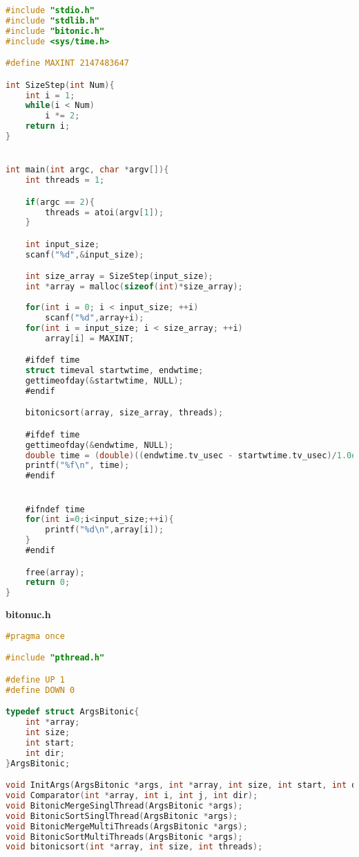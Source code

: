\documentclass[pdf, unicode, 12pt, a4paper,oneside,fleqn]{article}
\begin{document}
\begin{lstlisting}[language=C]
#include "stdio.h"
#include "stdlib.h"
#include "bitonic.h"
#include <sys/time.h>

#define MAXINT 2147483647

int SizeStep(int Num){
    int i = 1;
    while(i < Num)
        i *= 2;
    return i;
}


int main(int argc, char *argv[]){
    int threads = 1;

    if(argc == 2){
        threads = atoi(argv[1]);
    }

    int input_size;
    scanf("%d",&input_size);

    int size_array = SizeStep(input_size); 
    int *array = malloc(sizeof(int)*size_array);
    
    for(int i = 0; i < input_size; ++i)
        scanf("%d",array+i);
    for(int i = input_size; i < size_array; ++i)
        array[i] = MAXINT;

    #ifdef time
    struct timeval startwtime, endwtime;
    gettimeofday(&startwtime, NULL);
    #endif

    bitonicsort(array, size_array, threads);

    #ifdef time
    gettimeofday(&endwtime, NULL);
    double time = (double)((endwtime.tv_usec - startwtime.tv_usec)/1.0e6 + endwtime.tv_sec - startwtime.tv_sec);
    printf("%f\n", time);
    #endif


    #ifndef time
    for(int i=0;i<input_size;++i){
        printf("%d\n",array[i]);
    }
    #endif

    free(array);
    return 0;
}
\end{lstlisting}

{\large\textbf{bitonuc.h}}

\begin{lstlisting}[language=C]
#pragma once

#include "pthread.h"

#define UP 1
#define DOWN 0

typedef struct ArgsBitonic{
    int *array;
    int size;
    int start;
    int dir;
}ArgsBitonic;

void InitArgs(ArgsBitonic *args, int *array, int size, int start, int dir);
void Comparator(int *array, int i, int j, int dir);
void BitonicMergeSinglThread(ArgsBitonic *args);
void BitonicSortSinglThread(ArgsBitonic *args);
void BitonicMergeMultiThreads(ArgsBitonic *args);
void BitonicSortMultiThreads(ArgsBitonic *args);
void bitonicsort(int *array, int size, int threads);
\end{lstlisting}
\end{document}
